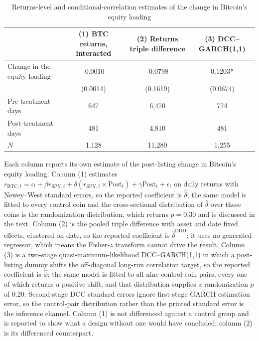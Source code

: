 \begin{table}[t]
\centering
\begin{threeparttable}
\caption{Returns-level and conditional-correlation estimates of the change in Bitcoin's equity loading}
\label{tab:complementary}
\begin{tabular}{lccc}
\toprule
 & (1) BTC returns, interacted & (2) Returns triple difference & (3) DCC--GARCH(1,1) \\
\midrule
Change in the equity loading & -0.0010 & -0.0798 & 0.1203* \\
 & (0.0014) & (0.1619) & (0.0674) \\
Pre-treatment days & 647 & 6,470 & 774 \\
Post-treatment days & 481 & 4,810 & 481 \\
$N$ & 1,128 & 11,280 & 1,255 \\
\bottomrule
\end{tabular}
\begin{tablenotes}[flushleft]
\footnotesize
\item Each column reports its own estimate of the post-listing change in Bitcoin's equity loading. Column (1) estimates $r_{\mathrm{BTC},t} = \alpha + \beta r_{\mathrm{SPY},t} + \delta (r_{\mathrm{SPY},t} \times \mathrm{Post}_t) + \gamma \mathrm{Post}_t + \epsilon_t$ on daily returns with Newey--West standard errors, so the reported coefficient is $\hat\delta$; the same model is fitted to every control coin and the cross-sectional distribution of $\hat\delta$ over those coins is the randomization distribution, which returns $p = 0.30$ and is discussed in the text. Column (2) is the pooled triple difference with asset and date fixed effects, clustered on date, so the reported coefficient is $\hat\delta^{\mathrm{DDD}}$; it uses no generated regressor, which means the Fisher-$z$ transform cannot drive the result. Column (3) is a two-stage quasi-maximum-likelihood DCC--GARCH(1,1) in which a post-listing dummy shifts the off-diagonal long-run correlation target, so the reported coefficient is $\hat\phi$; the same model is fitted to all nine control-coin pairs, every one of which returns a positive shift, and that distribution supplies a randomization $p$ of 0.20. Second-stage DCC standard errors ignore first-stage GARCH estimation error, so the control-pair distribution rather than the printed standard error is the inference channel. Column (1) is not differenced against a control group and is reported to show what a design without one would have concluded; column (2) is its differenced counterpart.
\end{tablenotes}
\end{threeparttable}
\end{table}
